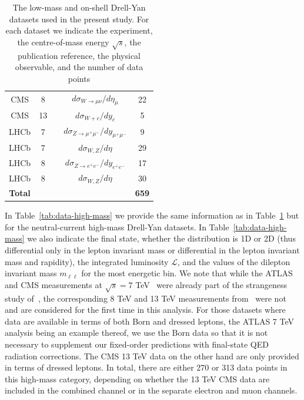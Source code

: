 \documentclass[withindex,glossary]{cam-thesis}
\begin{document}
\begin{table}[H]
\begin{center}
\begin{tabular}{ c c c c c }
 CMS    & 8 	& \cite{Khachatryan:2016pev}	  & $d\sigma_{W\rightarrow \mu\nu}/d\eta_\mu$  & 22 \\
 CMS 	& 13 	& \cite{Sirunyan:2018hde}	  & $d\sigma_{W+c}/dy_c$			              & 5 \\
 \midrule
 LHCb   & 7     & \cite{Aaij:2012vn}              & $d\sigma_{Z\rightarrow\mu^+\mu^-}/dy_{\mu^+\mu^-}$   & 9 \\
 LHCb   & 7     & \cite{Aaij:2015gna}             & $d\sigma_{W,Z}/d\eta$ & 29 \\
 LHCb   & 8     & \cite{Aaij:2012mda}             & $d\sigma_{Z \rightarrow e^+e^-}/dy_{e^+e^-}$         & 17 \\
 LHCb   & 8     & \cite{Aaij:2015zlq}             & $d\sigma_{W,Z}/d\eta$           & 30 \\
 \midrule
 {\bf Total}  &       &                                  &                                       & {\bf 659} \\
 \bottomrule
\end{tabular}
\end{center}
\caption{\small The low-mass and on-shell Drell-Yan datasets used in the present study.
  For each dataset we indicate the experiment, the centre-of-mass energy $\sqrt{s}$,
  the publication reference, the physical observable, and the number of data points
}
\label{tab:data-low-mass}
\end{table}

In Table~\ref{tab:data-high-mass} we provide the same
information as in Table~\ref{tab:data-low-mass} but for the neutral-current high-mass Drell-Yan datasets.
%
In Table~\ref{tab:data-high-mass} we also indicate the final state,
whether the distribution is 1D or 2D (thus differential only in the
lepton invariant mass or differential in the lepton invariant mass and
rapidity), the integrated luminosity $\mathcal{L}$,
and the values of the dilepton invariant mass $m_{\ell\ell}$ for the most energetic bin.
  We note that while the ATLAS and CMS measurements at $\sqrt{s}=7$ TeV~\cite{Aad:2013iua,Chatrchyan:2013tia}
  were already part of the  strangeness study of~\cite{Faura:2020oom},
  the corresponding 8 TeV and 13 TeV measurements from~\cite{Aad:2016zzw,CMS:2014jea,Sirunyan:2018owv}
were not and are considered for the first time in this analysis.
%
For those datasets where data are available in terms of both Born
and dressed leptons, the ATLAS 7 TeV analysis being an example thereof, we use
the Born data so that it is not necessary to supplement our fixed-order predictions with
final-state QED radiation corrections. The CMS 13 TeV data on the
other hand are only provided in terms of dressed leptons. 
%
In total, there are either 270 or 313 data points in this high-mass category, depending on whether the
13 TeV CMS data are included in the combined channel or in the separate electron and muon channels.
\end{document}
